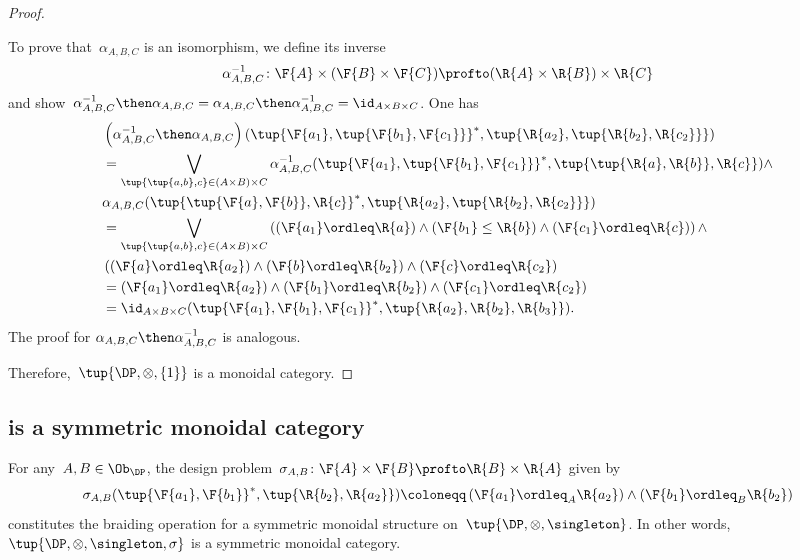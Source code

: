 \begin{proof}
\begin{itemize}
\begin{equation}
    \end{equation}
    To prove that~$\alpha_{A,B,C}$ is an isomorphism, we define its inverse \begin{equation}
                                                                              \alpha_{A,B,C}^{-1}\colon \F{A}\times (\F{B}\times \F{C}) \profto (\R{A}\times \R{B})\times \R{C}
    \end{equation}
    and show~$\alpha_{A,B,C}^{-1}\then \alpha_{A,B,C}=\alpha_{A,B,C}\then \alpha_{A,B,C}^{-1}= \id_{A\times B\times C}$. One has
    \begin{equation}
      \begin{aligned}
        &\left( \alpha_{A,B,C}^{-1}\then \alpha_{A,B,C} \right)(\tup{\F{a_1},\tup{\F{b_1},\F{c_1}}}^*,\tup{\R{a_2},\tup{\R{b_2},\R{c_2}}})\\
        &=\bigvee_{\tup{\tup{a,b},c}\in (A\times B)\times C}
        \alpha_{A,B,C}^{-1}(\tup{\F{a_1},\tup{\F{b_1},\F{c_1}}}^*,\tup{\tup{\R{a},\R{b}},\R{c}})\wedge\\
        &\alpha_{A,B,C}(\tup{\tup{\F{a},\F{b}},\R{c}}^*,\tup{\R{a_2},\tup{\R{b_2},\R{c_2}}})\\
        &=\bigvee_{\tup{\tup{a,b},c}\in (A\times B)\times C}\left( (\F{a_1}\ordleq \R{a}) \wedge (\F{b_1}\leq \R{b}) \wedge (\F{c_1}\ordleq \R{c})\right)\wedge \\
        & \left((\F{a}\ordleq \R{a_2})\wedge (\F{b}\ordleq \R{b_2}) \wedge (\F{c}\ordleq \R{c_2}\right)\\
        &=(\F{a_1}\ordleq \R{a_2}) \wedge (\F{b_1}\ordleq \R{b_2}) \wedge (\F{c_1}\ordleq \R{c_2})\\
        &=\id_{A\times B\times C}(\tup{\F{a_1},\F{b_1},\F{c_1}}^*,\tup{\R{a_2},\R{b_2},\R{b_3}}).
      \end{aligned}
    \end{equation}
    The proof for $\alpha_{A,B,C}\then \alpha_{A,B,C}^{-1}$ is analogous.
  \end{itemize}
  Therefore,~$\tup{\DP,\otimes, \{1\}}$ is a monoidal category.
\end{proof}

\subsection{\DP is a symmetric monoidal category}
\begin{lemma}
  \label{lem:symmetricmonoidaldp}
  For any~$A,B \in\Ob_\DP$, the design problem~$\sigma_{A,B}\colon \F{A} \times \F{B} \profto \R{B} \times \R{A}$ given by
  \begin{equation}
    \sigma_{A,B}(\tup{\F{a_1},\F{b_1}}^*,\tup{\R{b_2},\R{a_2}})\coloneqq \left(\F{a_1}\ordleq_A \R{a_2}\right)\wedge \left(\F{b_1}\ordleq_B \R{b_2}\right)
  \end{equation}
  constitutes the braiding operation for a symmetric monoidal structure on~$\tup{\DP,\otimes,\singleton}$. In other words,~$\tup{\DP, \otimes, \singleton, \sigma}$ is a symmetric monoidal category.
\end{lemma}

